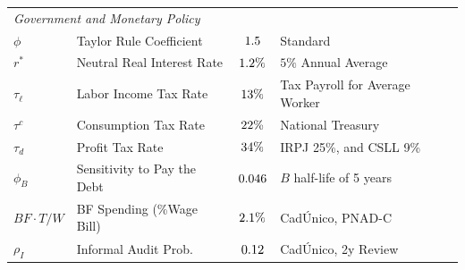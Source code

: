 \begin{table}[htbp]
\begin{tabular}{llcl}
\multicolumn{4}{l}{\textit{Government and Monetary Policy}} \\[2pt]
$\phi$           & Taylor Rule Coefficient      & $1.5$ & Standard \parencite{taylor1993discretion} \\
$r^*$            & Neutral Real Interest Rate   & $1.2\%$     & $5\%$ Annual Average \\
$\tau_\ell$      & Labor Income Tax Rate        & $13\%$      & Tax Payroll for Average Worker \\
$\tau^c$         & Consumption Tax Rate         & $22\%$      & National Treasury \\
$\tau_d$         & Profit Tax Rate              & $34\%$      & IRPJ 25\%, and CSLL 9\% \\
$\phi_B$         & Sensitivity to Pay the Debt  & $0.046$      & $B$ half-life of 5 years \\
$BF \cdot T / W$ & BF Spending (\%Wage Bill)    & $2.1\%$    & CadÚnico, PNAD-C \\
$\rho_I$         & Informal Audit Prob.         & $0.12$      & CadÚnico, 2y Review \\
\bottomrule
\end{tabular}
\end{table}

